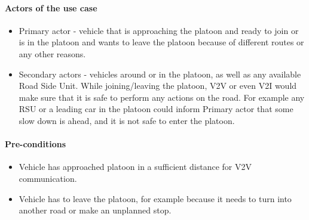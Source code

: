 \paragraph{Actors of the use case}
\begin{itemize}[noitemsep]
    \item Primary actor - vehicle that is approaching the platoon and ready to join or is in the platoon and wants to leave the platoon because of different routes or any other reasons.
    \item Secondary actors - vehicles around or in the platoon, as well as any available Road Side Unit. While joining/leaving the platoon, \acrshort{V2V} or even \acrshort{V2I} would make sure that it is safe to perform any actions on the road. For example any \acrshort{RSU} or a leading car in the platoon could inform Primary actor that some slow down is ahead, and it is not safe to enter the platoon.
\end{itemize}
% 
\paragraph{Pre-conditions}
\begin{itemize}[noitemsep]
    \item Vehicle has approached platoon in a sufficient distance for \acrshort{V2V} communication.
    \item Vehicle has to leave the platoon, for example because it needs to turn into another road or make an unplanned stop.
\end{itemize}
% 
